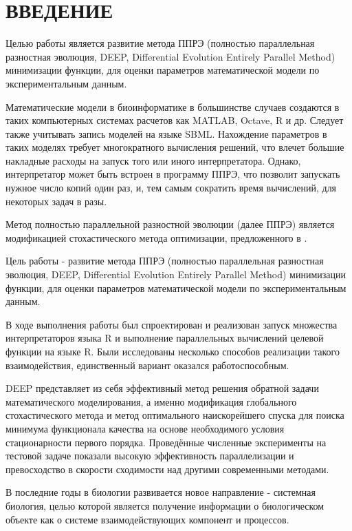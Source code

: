 \chapter*{ВВЕДЕНИЕ}

Целью работы является развитие метода ППРЭ (полностью параллельная разностная эволюция, DEEP, Differential Evolution Entirely Parallel Method) минимизации функции, для оценки параметров математической модели по экспериментальным данным.

Математические модели в биоинформатике в большинстве случаев создаются в таких компьютерных системах расчетов как MATLAB, Octave, R и др. Следует также учитывать запись моделей на языке SBML. Нахождение параметров в таких моделях требует многократного вычисления решений, что влечет большие накладные расходы на запуск того или иного интерпретатора. Однако, интерпретатор может быть встроен в программу ППРЭ, что позволит запускать нужное число копий один раз, и, тем самым сократить время вычислений, для некоторых задач в разы.



Метод полностью параллельной разностной эволюции (далее ППРЭ) \cite{Kozlov11, Kozlov13} является модификацией стохастического метода оптимизации, предложенного в \cite{Storn95}.

Цель работы - развитие метода ППРЭ (полностью параллельная разностная эволюция, DEEP, Differential Evolution Entirely Parallel Method) минимизации функции, для оценки параметров математической модели по экспериментальным данным.

В ходе выполнения работы был спроектирован и реализован запуск множества интерпретаторов языка R и выполнение параллельных вычислений целевой функции на языке R. Были исследованы несколько способов реализации такого взаимодействия, единственный вариант оказался работоспособным.



DEEP представляет из себя эффективный метод решения обратной задачи математического моделирования, а именно модификация глобального стохастического метода и метод оптимального наискорейшего спуска для поиска минимума функционала качества на основе необходимого условия стационарности первого порядка. Проведённые численные эксперименты на тестовой задаче показали высокую эффективность параллелизации и превосходство в скорости сходимости над другими современными методами.

В последние годы в биологии развивается новое направление - системная биология, целью которой является получение информации о биологическом объекте как о системе взаимодействующих компонент и процессов.

